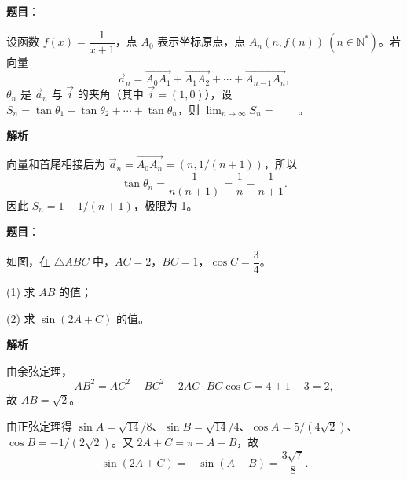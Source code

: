 \begin{answer}

\textbf{题目}：

设函数 \(f(x)=\dfrac1{x+1}\)，点 \(A_0\) 表示坐标原点，点 \(A_n(n,f(n))\ (n\in\mathbb N^*)\)。若向量
\nopagebreak[4]
\[
\vec a_n=\overrightarrow{A_0A_1}+\overrightarrow{A_1A_2}+\cdots+\overrightarrow{A_{n-1}A_n},
\]
\(\theta_n\) 是 \(\vec a_n\) 与 \(\vec i\) 的夹角（其中 \(\vec i=(1,0)\)），设 \(S_n=\tan\theta_1+\tan\theta_2+\cdots+\tan\theta_n\)，则 \(\displaystyle\lim_{n\to\infty}S_n=\underline{\qquad}\)。

\textbf{解析}

向量和首尾相接后为 \(\vec a_n=\overrightarrow{A_0A_n}=(n,1/(n+1))\)，所以
\nopagebreak[4]
\[
\tan\theta_n=\frac{1}{n(n+1)}=\frac1n-\frac1{n+1}.
\]
因此 \(S_n=1-1/(n+1)\)，极限为 1。


\end{answer}
\begin{answer}

\textbf{题目}：

如图，在 \(\triangle ABC\) 中，\(AC=2\)，\(BC=1\)，\(\cos C=\dfrac34\)。

(1) 求 \(AB\) 的值；

(2) 求 \(\sin(2A+C)\) 的值。
\nopagebreak[4]
\begin{center}\end{center}
\nopagebreak[4]
\textbf{解析}


由余弦定理，
\nopagebreak[4]
\[
AB^2=AC^2+BC^2-2AC\cdot BC\cos C=4+1-3=2,
\]
故 \(AB=\sqrt2\)。


由正弦定理得 \(\sin A=\sqrt{14}/8\)、\(\sin B=\sqrt{14}/4\)、\(\cos A=5/(4\sqrt2)\)、\(\cos B=-1/(2\sqrt2)\)。又 \(2A+C=\pi+A-B\)，故
\nopagebreak[4]
\[
\sin(2A+C)=-\sin(A-B)=\frac{3\sqrt7}{8}.
\]



\end{answer}
